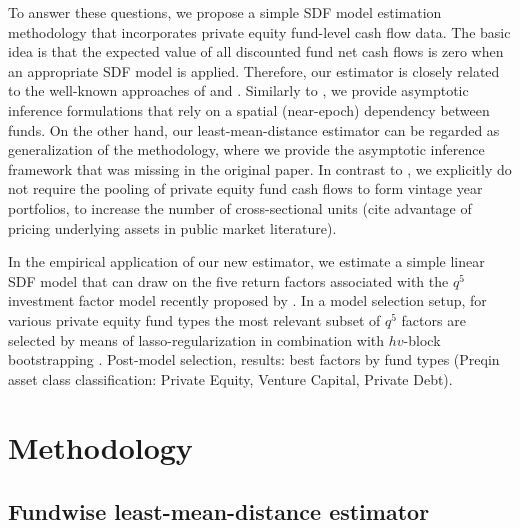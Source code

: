 \documentclass[12pt]{article}
\begin{document}
To answer these questions, we propose a simple SDF model estimation methodology that incorporates private equity fund-level cash flow data.
The basic idea is that the expected value of all discounted fund net cash flows is zero when an appropriate SDF model is applied.
Therefore, our estimator is closely related to the well-known approaches of \cite{DLP12} and \cite{KN16}.
Similarly to \cite{KN16}, we provide asymptotic inference formulations that rely on a spatial (near-epoch) dependency between funds.
On the other hand, our least-mean-distance estimator can be regarded as generalization of the \cite{DLP12} methodology, where we provide the asymptotic inference framework that was missing in the original paper.
In contrast to \cite{DLP12}, we explicitly do not require the pooling of private equity fund cash flows to form vintage year portfolios, to increase the number of cross-sectional units (cite advantage of pricing underlying assets in public market literature).

In the empirical application of our new estimator, we estimate a simple linear SDF model that can draw on the five return factors associated with the $q^5$ investment factor model recently proposed by \cite{HXZ20}.
In a model selection setup, for various private equity fund types the most relevant subset of $q^5$ factors are selected by means of lasso-regularization \citep{T96} in combination with $hv$-block bootstrapping \citep{R00}.
Post-model selection, results: best factors by fund types (Preqin asset class classification: Private Equity, Venture Capital, Private Debt).



\section{Methodology}

\subsection{Fundwise least-mean-distance estimator}
\end{document}
